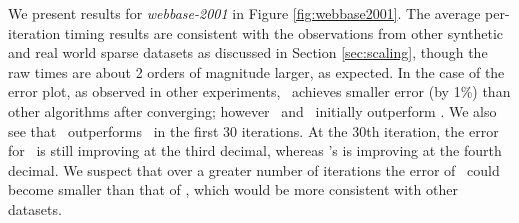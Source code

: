
We present results for \emph{webbase-2001} in Figure \ref{fig:webbase2001}.
The average per-iteration timing results are consistent with the observations from other synthetic and real world sparse datasets as discussed in Section \ref{sec:scaling}, though the raw times are about 2 orders of magnitude larger, as expected. 
In the case of the error plot, as observed in other experiments, \BPP\ achieves smaller error (by 1\%) than other algorithms after converging; however \MU\ and \HALS\ initially outperform \BPP. 
We also see that \MU\ outperforms \HALS\ in the first 30 iterations. 
At the 30th iteration, the error for \HALS\ is still improving at the third decimal, whereas \MU's is improving at the fourth decimal. 
We suspect that over a greater number of iterations the error of \HALS\ could become smaller than that of \MU, which would be more consistent with other datasets. 

